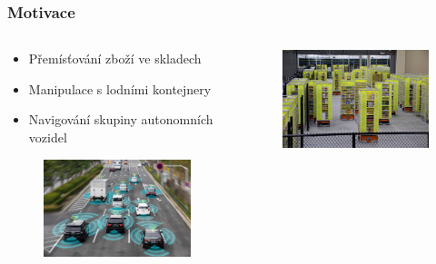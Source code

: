 \documentclass[aspectratio=169,t,xcolor=table]{beamer}
\begin{document}
\begin{frame}
\frametitle{Motivace}
\begin{columns}
\begin{column}{.5\textwidth}
\begin{itemize}
    \item Přemísťování zboží ve skladech
    \item Manipulace s lodními kontejnery
    \item Navigování skupiny autonomních vozidel
\end{itemize}
\begin{figure}
        \centering
        \includegraphics[width=.7\textwidth]{figs/autonomous-car.jpg}
    \end{figure}
 
\end{column}
\begin{column}{.4\textwidth}
    \begin{figure}
        \centering
        \includegraphics[width=.7\textwidth]{figs/roboti-amazon.jpg}
    \end{figure}
    

\end{column}
\end{columns}
\end{frame}
\end{document}
